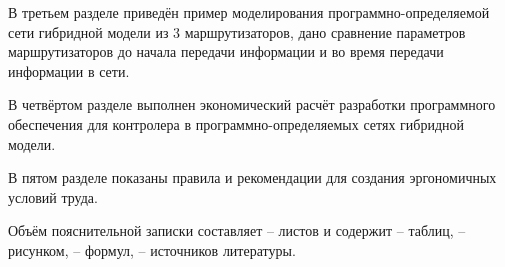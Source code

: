В третьем разделе приведён пример моделирования программно-определяемой сети гибридной модели из 3 маршрутизаторов, дано сравнение параметров
маршрутизаторов до начала передачи информации и во время передачи информации в сети.

В четвёртом разделе выполнен экономический расчёт разработки программного
обеспечения для контролера в программно-определяемых сетях гибридной модели.

В пятом разделе показаны правила и рекомендации для создания эргономичных
условий труда.

Объём пояснительной записки составляет -- листов и содержит
-- таблиц, -- рисунком, -- формул, -- источников литературы.

